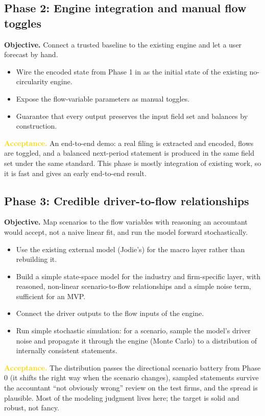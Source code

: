 \documentclass[11pt]{article}
\newcommand{\lead}[2]{\par\addvspace{5pt}\textbf{\textcolor{#1}{#2}}}
\begin{document}
\subsection{Phase 2: Engine integration and manual flow toggles}
\lead{navytwo}{Objective.} Connect a trusted baseline to the existing engine and let a user forecast by hand.
\begin{itemize}
  \item Wire the encoded state from Phase 1 in as the initial state of the existing no-circularity engine.
  \item Expose the flow-variable parameters as manual toggles.
  \item Guarantee that every output preserves the input field set and balances by construction.
\end{itemize}
\lead{gold}{Acceptance.} An end-to-end demo: a real filing is extracted and encoded, flows are toggled, and a balanced next-period statement is produced in the same field set under the same standard. This phase is mostly integration of existing work, so it is fast and gives an early end-to-end result.

\subsection{Phase 3: Credible driver-to-flow relationships}
\lead{navytwo}{Objective.} Map scenarios to the flow variables with reasoning an accountant would accept, not a naive linear fit, and run the model forward stochastically.
\begin{itemize}
  \item Use the existing external model (Jodie's) for the macro layer rather than rebuilding it.
  \item Build a simple state-space model for the industry and firm-specific layer, with reasoned, non-linear scenario-to-flow relationships and a simple noise term, sufficient for an MVP.
  \item Connect the driver outputs to the flow inputs of the engine.
  \item Run simple stochastic simulation: for a scenario, sample the model's driver noise and propagate it through the engine (Monte Carlo) to a distribution of internally consistent statements.
\end{itemize}
\lead{gold}{Acceptance.} The distribution passes the directional scenario battery from Phase 0 (it shifts the right way when the scenario changes), sampled statements survive the accountant ``not obviously wrong'' review on the test firms, and the spread is plausible. Most of the modeling judgment lives here; the target is solid and robust, not fancy.
\end{document}

